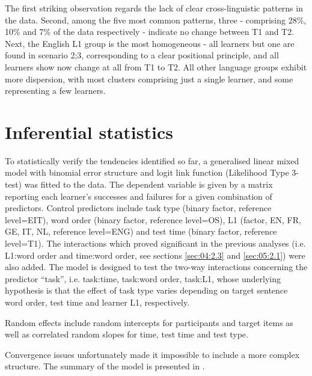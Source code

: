 The first striking observation regards the lack of clear cross-linguistic patterns in the data. Second, among the five most common patterns, three - comprising 28\%, 10\% and 7\% of the data respectively - indicate no change between T1 and T2. Next, the English L1 group is the most homogeneous - all learners but one are found in scenario 2;3, corresponding to a clear positional principle, and all learners show now change at all from T1 to T2. All other language groups exhibit more dispersion, with most clusters comprising just a single learner, and some representing a few learners. 

\section{Inferential statistics}\label{sec:06:4}

To statistically verify the tendencies identified so far, a generalised linear mixed model with binomial error structure and logit link function (Likelihood Type 3-test) was fitted to the data. The dependent variable is given by a matrix reporting each learner’s successes and failures for a given combination of predictors. Control predictors include task type (binary factor, reference level=EIT), word order (binary factor, reference level=OS), L1 (factor, EN, FR, GE, IT, NL, reference level=ENG) and test time (binary factor, reference level=T1). The interactions which proved significant in the previous analyses (i.e. L1:word order and time:word order, see sections \ref{sec:04:2.3} and \ref{sec:05:2.1}) were also added. The model is designed to test the two-way interactions concerning the predictor “task”, i.e. task:time, task:word order, task:L1, whose underlying hypothesis is that the effect of task type varies depending on target sentence word order, test time and learner L1, respectively. 

Random effects include random intercepts for participants and target items as well as correlated random slopes for time, test time and test type. 

Convergence issues unfortunately made it impossible to include a more complex structure. The summary of the model is presented in .

